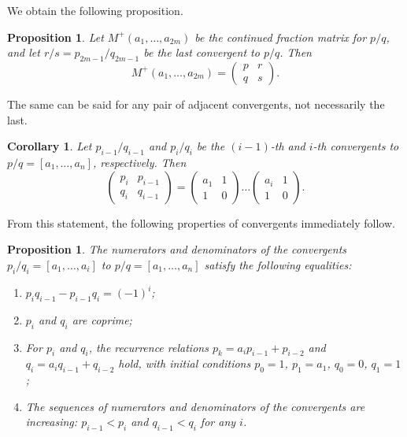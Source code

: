 \documentclass[a4paper,11pt]{amsart}
\theoremstyle{plain}
\newtheorem{prop}[theorem]{Proposition}
\newtheorem{corollary}[theorem]{Corollary}
\theoremstyle{remark}
\theoremstyle{definition}
\numberwithin{equation}{section}
\numberwithin{figure}{section}
\begin{document}
We obtain the following proposition.

\begin{prop}\label{prop:matrixpos} Let $M^+(a_1, \dots, a_{2m})$ be the continued fraction matrix for $p/q$, and let $r/s = p_{2m-1}/q_{2m-1}$ be the last convergent to $p/q$. Then
\[
M^+(a_1, \dots, a_{2m}) = \begin{pmatrix}p & r\\q & s
\end{pmatrix}.
\]
\end{prop}

The same can be said for any pair of adjacent convergents, not necessarily the last.

\begin{corollary} Let $p_{i-1}/q_{i-1}$ and $p_i/q_i$ be the $(i-1)$-th and $i$-th convergents to $p/q = [a_1, \dots, a_n]$, respectively. Then
\begin{equation}\label{eq:contdecomp}
\begin{pmatrix}p_i & p_{i-1}\\q_i & q_{i-1}
\end{pmatrix}=
\begin{pmatrix}a_1 & 1\\1 & 0
\end{pmatrix}
\dots 
\begin{pmatrix}a_i & 1\\1 & 0
\end{pmatrix}.
\end{equation}
\end{corollary}

From this statement, the following properties of convergents immediately follow.

\begin{prop}\label{prop:contfrac} The numerators and denominators of the convergents $p_i/q_i = [a_1, \dots, a_i]$ to $p/q = [a_1, \dots, a_n]$ satisfy the following equalities:

\begin{enumerate}
\item $p_i q_{i-1} - p_{i-1} q_i = (-1)^i$;
\item $p_i$ and $q_i$ are coprime;
\item For $p_i$ and $q_i$, the recurrence relations $p_k = a_i p_{i-1} + p_{i-2}$ and $q_i = a_i q_{i-1} + q_{i-2}$ hold, with initial conditions $p_0 = 1$, $p_1 = a_1$, $q_0 = 0$, $q_1 = 1$;
\item The sequences of numerators and denominators of the convergents are increasing: \mbox{$p_{i-1} < p_i$} and $q_{i-1} < q_i$ for any $i$.
\end{enumerate}
\end{prop}
\end{document}
